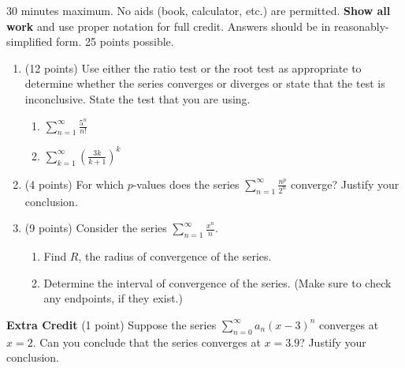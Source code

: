 \documentclass[12pt]{article}
\newcommand{\ds}{\displaystyle}
\begin{document}
30 minutes maximum.  No aids (book, calculator, etc.) are permitted.  \textbf{Show all work} and use proper notation for full credit.  Answers should be in reasonably-simplified form.  25 points possible.

\begin{enumerate}
\item (12 points) Use either the ratio test or the root test as appropriate to determine whether the series converges or diverges or state that the test is inconclusive. State the test that you are using.
	\begin{enumerate}
	\item $\ds \sum_{n=1}^{\infty} \frac{5^{n}}{n!}$ 
	\vfill
	\item $\ds \sum_{k=1}^{\infty} \left(\frac{3k}{k+1}\right)^k$
	\vfill
	\end{enumerate}

\item (4 points) For which $p$-values does the series $\ds \sum_{n=1}^{\infty} \frac{n^p}{2^n}$ converge? Justify your conclusion.
\vfill
\newpage

\item (9 points) Consider the series $\ds \sum_{n=1}^{\infty}\frac{x^n}{n}.$ %
	\begin{enumerate}
	\item Find $R$, the radius of convergence of the series.
	\vfill
	\item Determine the interval of convergence of the series. (Make sure to check any endpoints, if they exist.)
	\vfill
	\vfill
	\end{enumerate}
\end{enumerate}
\newpage
\textbf{Extra Credit} (1 point) Suppose the series $\ds \sum_{n=0}^{\infty} a_n(x-3)^n$ converges at $x=2.$ Can you conclude that the series converges at $x=3.9$? Justify your conclusion.
\vfill
\end{document}
